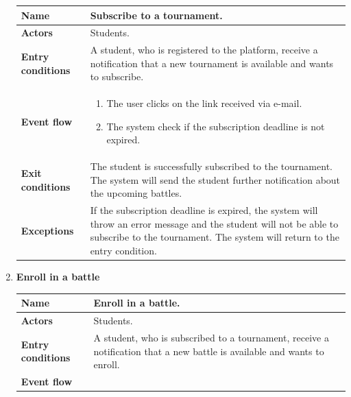 \begin{enumerate}[label=\textbf{UC.\arabic*}]
\begin{table}[H]
\begin{tabular}{|m{3.2cm}|m{9.8cm}|}
                    \hline
                    \textbf{Name} & Subscribe to a tournament.\\
                    \hline
                    \textbf{Actors} & Students. \\
                    \hline
                    \textbf{Entry conditions}  & A student, who is registered to the platform, receive a notification that a new tournament is available and wants to subscribe.\\
                    \hline
                    \textbf{Event flow}  & 
                    \begin{enumerate}[label=\arabic*.]
                        \item The user clicks on the link received via e-mail.
                        \item The system check if the subscription deadline is not expired.
                    \end{enumerate}\\ 
                    \hline
                    \textbf{Exit conditions}  & The student is successfully subscribed to the tournament. The system will send the student further notification about the upcoming battles. \\
                    \hline
                    \textbf{Exceptions}  & If the subscription deadline is expired, the system will throw an error message and the student will not be able to subscribe to the tournament. The system will return to the entry condition. \\
                    \hline 
                \end{tabular}
        \end{table}
        \item {} \textbf{Enroll in a battle}
        \begin{table}[H]
    	    \centering
                \renewcommand{\arraystretch}{1.5}
                \begin{tabular}{|m{3.2cm}|m{9.8cm}|}
                    \hline
                    \textbf{Name} & Enroll in a battle. \\
                    \hline
                    \textbf{Actors} & Students. \\
                    \hline
                    \textbf{Entry conditions}  & A student, who is subscribed to a tournament, receive a notification that a new battle is available and wants to enroll.\\
                    \hline
                    \textbf{Event flow}  & 

\end{tabular}
\end{table}
\end{enumerate}
